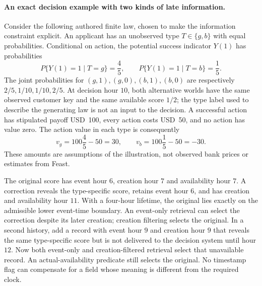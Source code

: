 \paragraph{An exact decision example with two kinds of late information.}
Consider the following authored finite law, chosen to make the information
constraint explicit. An applicant has an unobserved type $T\in\{g,b\}$ with
equal probabilities. Conditional on action, the potential success indicator
$Y(1)$ has probabilities
\begin{equation}
 P\{Y(1)=1\mid T=g\}=\frac45,\qquad
 P\{Y(1)=1\mid T=b\}=\frac15.
 \label{exec19:feast-law}
\end{equation}
The joint probabilities for $(g,1),(g,0),(b,1),(b,0)$ are respectively
$2/5,1/10,1/10,2/5$. At decision hour $10$, both alternative worlds have the
same observed customer key and the same available score $1/2$; the type label
used to describe the generating law is not an input to the decision. A
successful action has stipulated payoff USD~100, every action costs USD~50,
and no action has value zero. The action value in each type is consequently
\begin{equation}
 v_g=100\frac45-50=30,\qquad
 v_b=100\frac15-50=-30.
 \label{exec19:feast-value}
\end{equation}
These amounts are assumptions of the illustration, not observed bank prices
or estimates from Feast.\citep{exec19_feast_reference}

The original score has event hour $6$, creation hour $7$ and availability hour
$7$. A correction reveals the type-specific score, retains event hour $6$,
and has creation and availability hour $11$. With a four-hour lifetime, the
original lies exactly on the admissible lower event-time boundary. An
event-only retrieval can select the correction despite its later creation;
creation filtering selects the original. In a second history, add a record
with event hour $9$ and creation hour $9$ that reveals the same type-specific
score but is not delivered to the decision system until hour $12$. Now both
event-only and creation-filtered retrieval select that unavailable record.
An actual-availability predicate still selects the original. No timestamp
flag can compensate for a field whose meaning is different from the required
clock.\citep{exec19_feast_reference}

